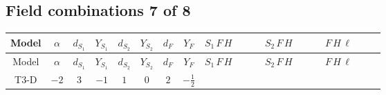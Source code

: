 \documentclass[8pt]{article}
\begin{document}
\begin{landscape}
\subsection*{Field combinations 7 of 8}
\begin{longtable}{@{}cccccccc >{\raggedright\arraybackslash}p{0.21\linewidth} >{\raggedright\arraybackslash}p{0.21\linewidth} >{\raggedright\arraybackslash}p{0.21\linewidth}@{}}
\toprule
Model & $\alpha$ & $d_{S_1}$ & $Y_{S_1}$ & $d_{S_2}$ & $Y_{S_2}$ & $d_F$ & $Y_F$ & $S_1\,F\,H$ & $S_2\,F\,H$ & $F\,H\,\ell$ \\
\midrule
\endfirsthead
\toprule
Model & $\alpha$ & $d_{S_1}$ & $Y_{S_1}$ & $d_{S_2}$ & $Y_{S_2}$ & $d_F$ & $Y_F$ & $S_1\,F\,H$ & $S_2\,F\,H$ & $F\,H\,\ell$ \\
\midrule
\endhead
T3-D & $-2$ & $3$ & $-1$ & $1$ & $0$ & $2$ & $-\frac{1}{2}$ & \scriptsize\adjustbox{max width=\linewidth}{$\begin{gathered} -\frac{2 \hbar  \log \left(\frac{\bar{\mu}^{2}}{M_F^2}\right) \overline{y_{1,i_1,r_1}} \overline{Y_{e,i_2,i_3}} H_{a_1} S_{1,j_1} y_{1,i_2,r_1} Y_{e,i_1,i_3} H_{a_1}{}^{\dagger } S_{1,j_1}{}^{\dagger }}{\sqrt{3}} \\ -2 i \sqrt{\frac{2}{3}} \hbar  \log \left(\frac{\bar{\mu}^{2}}{M_F^2}\right) \overline{y_{1,i_1,r_1}} \overline{Y_{e,i_2,i_3}} H_{a_2} S_{1,j_2} y_{1,i_2,r_1} Y_{e,i_1,i_3} H_{a_1}{}^{\dagger } S_{1,j_1}{}^{\dagger } \mathcal{I}_{H1,a_1,a_2,j_2,j_1}{}^1 \\ -\frac{2 \hbar  \log \left(\frac{\bar{\mu}^{2}}{M_F^2}\right) \overline{y_{1,i_1,r_1}} H_{a_2} S_{1,j_2} y_{1,i_1,r_1} H_{a_1}{}^{\dagger } S_{1,j_1}{}^{\dagger } \mathcal{I}_{H1,a_1,a_2,j_2,j_1}{}^2 \lambda_{HS_1}^{(1)}^{(2)}}{\sqrt{3}}\end{gathered}$} & \scriptsize\adjustbox{max width=\linewidth}{$\begin{gathered} -2 \hbar  \log \left(\frac{\bar{\mu}^{2}}{M_F^2}\right) \overline{y_{2,i_1,r_1}} \overline{Y_{e,i_2,i_3}} H_{a_1} S_2 y_{2,i_2,r_1} Y_{e,i_1,i_3} H_{a_1}{}^{\dagger } S_2{}^{\dagger } \\ -2 \hbar  \log \left(\frac{\bar{\mu}^{2}}{M_F^2}\right) \overline{y_{2,i_1,r_1}} H_{a_2} S_2 y_{2,i_1,r_1} H_{a_1}{}^{\dagger } S_2{}^{\dagger } \mathcal{I}_{H2,a_1,a_2}{}^1 \lambda_{HS_2}^{(1)}^{(1)}\end{gathered}$} & \scriptsize\adjustbox{max width=\linewidth}{$\begin{gathered} +\frac{2 \hbar  \log \left(\frac{\bar{\mu}^{2}}{M_F^2}\right) \overline{y_{1,i_1,r_1}} \overline{y_{2,i_2,r_1}} L_{a_4,i_2}{}^T\, C\, P_L\, L_{a_2,i_1} H_{a_1} H_{a_3} \lambda_5 \epsilon_{a_1,a_2} \epsilon_{a_3,a_4}}{\sqrt{3} M_F} \\ +\frac{2 \hbar  \log \left(\frac{\bar{\mu}^{2}}{M_F^2}\right) \overline{\lambda_5} \overline{L_{a_3,i_1}}\, C\, P_R\, \overline{L_{a_4,i_2}}{}^T y_{1,i_1,r_1} y_{2,i_2,r_1} \epsilon_{a_1,a_3} \epsilon_{a_2,a_4} H_{a_1}{}^{\dagger } H_{a_2}{}^{\dagger }}{\sqrt{3} M_F}\end{gathered}$} \\
\midrule
\bottomrule
\end{longtable}
\clearpage

\end{landscape}
\end{document}
